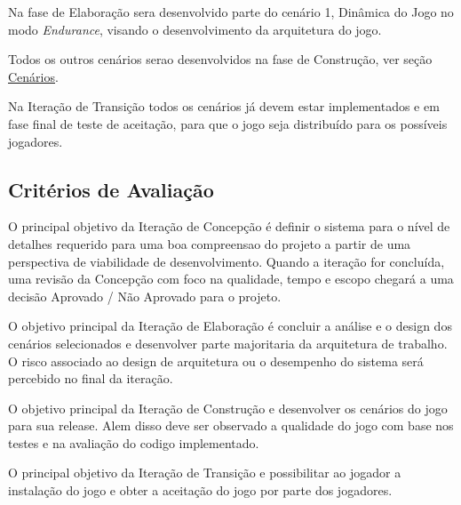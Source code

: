 Na fase de Elaboração sera desenvolvido parte do cenário 1, Dinâmica do Jogo no modo \textit{Endurance}, visando o desenvolvimento da arquitetura do jogo.

Todos os outros cenários serao desenvolvidos na fase de Construção, ver seção \hyperlink{cenarios}{Cenários}.

Na Iteração de Transição todos os cenários já devem estar implementados e em fase final de teste de aceitação, para que o jogo seja distribuído para os possíveis jogadores.

\subsection{Critérios de Avaliação}

O principal objetivo da Iteração de Concepção é definir o sistema para o nível de detalhes requerido para uma boa compreensao do projeto a partir de uma perspectiva de viabilidade de desenvolvimento. Quando a iteração for concluída, uma revisão da Concepção com foco na qualidade, tempo e escopo chegará a uma decisão Aprovado / Não Aprovado para o projeto.

O objetivo principal da Iteração de Elaboração é concluir a análise e o design dos cenários selecionados e desenvolver parte majoritaria da arquitetura de trabalho. O risco associado ao design de arquitetura ou o desempenho do sistema será percebido no final da iteração. 

O objetivo principal da Iteração de Construção e desenvolver os cenários do jogo para sua release. Alem disso deve ser observado a qualidade do jogo com base nos testes e na avaliação do codigo implementado.

O principal objetivo da Iteração de Transição e possibilitar ao jogador a instalação do jogo e obter a aceitação do jogo por parte dos jogadores.

